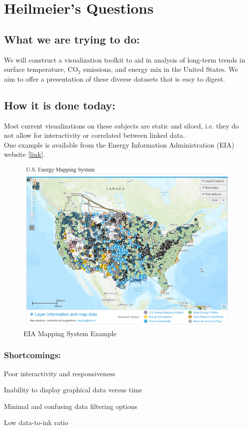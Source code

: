 \documentclass[sigconf,nonacm=true]{acmart}
\newenvironment{my_itemize}{
	\begin{itemize}
		\setlength{\itemsep}{1pt}
		\setlength{\parskip}{0pt}
		\setlength{\parsep}{0pt}}
	{\end{itemize}
}
\begin{document}
\section{Heilmeier's Questions}
\subsection{What we are trying to do:}
We will construct a visualization toolkit to aid in analysis of long-term trends in surface temperature, CO$_2$ emissions, and energy mix in the United States. We aim to offer a presentation of these diverse datasets that is easy to digest. 

\subsection{How it is done today:}
Most current visualizations on these subjects are static and siloed, i.e. they do not allow for interactivity or correlated between linked data.\\

 One example is available from the Energy Information Administration (EIA) website  [\href{https://www.eia.gov/state/maps.php?v=Electricity}{\color{blue}link}].
\begin{figure}[H]
	\centering
	\includegraphics[width=0.8\linewidth]{images/eia_Example}
	\caption{EIA Mapping System Example}
	\label{fig:eiaexample}
\end{figure}


\subsubsection{Shortcomings:}
\begin{my_itemize}
	\item Poor interactivity and responsiveness
	\item Inability to display graphical data versus time
	\item Minimal and confusing data filtering options
	\item Low data-to-ink ratio
\end{my_itemize}
\end{document}
